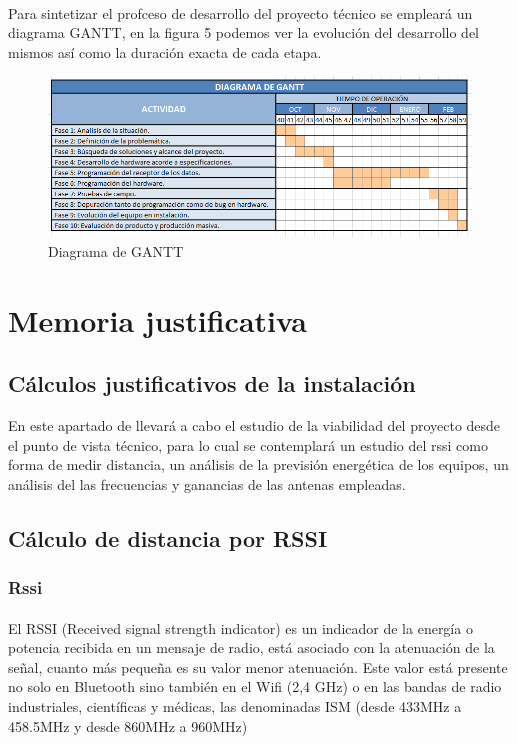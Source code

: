 \documentclass[a4paper ,12pt, onecolumn]{article}
\begin{document}
        \paragraph{}
        Para sintetizar el profceso de desarrollo del proyecto técnico se empleará un diagrama GANTT, en la
        figura 5 podemos ver la evolución del desarrollo del mismos así como la duración exacta de cada etapa. 
        \begin{center}
            \begin{figure}[ht]
                \centering
                \includegraphics[width=1\textwidth]{diagrama de gantt.PNG}
                \caption{Diagrama de GANTT}
                \label{fig:mesh18}
            \end{figure}
        \end{center} 
\section{Memoria justificativa}
    \subsection{Cálculos justificativos de la instalación}
        En este apartado de llevará a cabo el estudio de la viabilidad del proyecto desde el punto de vista
        técnico, para lo cual se contemplará un estudio del rssi como forma de medir distancia, un análisis 
        de la previsión energética de los equipos, un análisis del las frecuencias y ganancias de las antenas 
        empleadas.
    \subsection{Cálculo de distancia por RSSI}
        \subsubsection{Rssi}
            \paragraph{}
            El RSSI (Received signal strength indicator) es un indicador de la energía o potencia recibida en un mensaje de radio, 
            está asociado con la atenuación de la señal, cuanto más pequeña es su valor menor atenuación. Este valor está 
            presente no solo en Bluetooth sino también en el Wifi (2,4 GHz) o en las bandas de radio industriales, científicas y médicas,
            las denominadas ISM (desde 433MHz a 458.5MHz y desde 860MHz a 960MHz)
\end{document}
